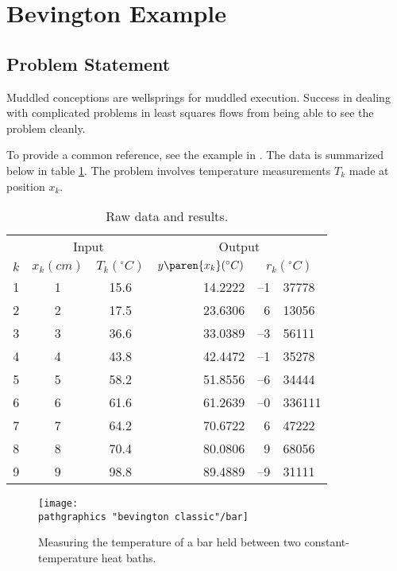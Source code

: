 \section{\label{sec:bevington example}Bevington Example}  %
\subsection{Problem Statement}  %
Muddled conceptions are wellsprings for muddled execution. Success in dealing with complicated problems in least squares flows from being able to see the problem cleanly.

To provide a common reference, see the example in \cite[ch 6]{Bevington}. The data is summarized below in table \ref{tab:bevington data and results}. The problem involves temperature measurements $T_{k}$ made at position $x_{k}$. 

\begin{table}[h]
	\begin{center}
		\begin{tabular}{rcc|rr@{.}l}
		  & \multicolumn{2}{c}{Input} &  \multicolumn{3}{c}{Output} \\
		  $k$ & $x_{k} (cm) $ & $T_{k} (^{\circ}C)$ & $y\paren{x_{k}} (^{\circ}C)$ & \multicolumn{2}{c}{$r_{k} (^{\circ}C)$} \\\hline
			 1 & 1 & 15.6 & 14.2222 & --1 & 37778 \\
			 2 & 2 & 17.5 & 23.6306 &   6 & 13056 \\
			 3 & 3 & 36.6 & 33.0389 & --3 & 56111 \\
			 4 & 4 & 43.8 & 42.4472 & --1 & 35278 \\
			 5 & 5 & 58.2 & 51.8556 & --6 & 34444 \\
			 6 & 6 & 61.6 & 61.2639 & --0 & 336111 \\
			 7 & 7 & 64.2 & 70.6722 &   6 & 47222 \\
			 8 & 8 & 70.4 & 80.0806 &   9 & 68056 \\
			 9 & 9 & 98.8 & 89.4889 & --9 & 31111 \\
		\end{tabular}
	\end{center}
	\caption{Raw data and results.}
	\label{tab:bevington data and results}
\end{table}%

\begin{figure}[htbp] %
   \centering
   \texttt{[image: \\pathgraphics "bevington classic"/bar]} 
   \caption[Measuring the temperature of a bar.]{Measuring the temperature of a bar held between two constant-temperature heat baths.}
   \label{fig:bar}
\end{figure}

